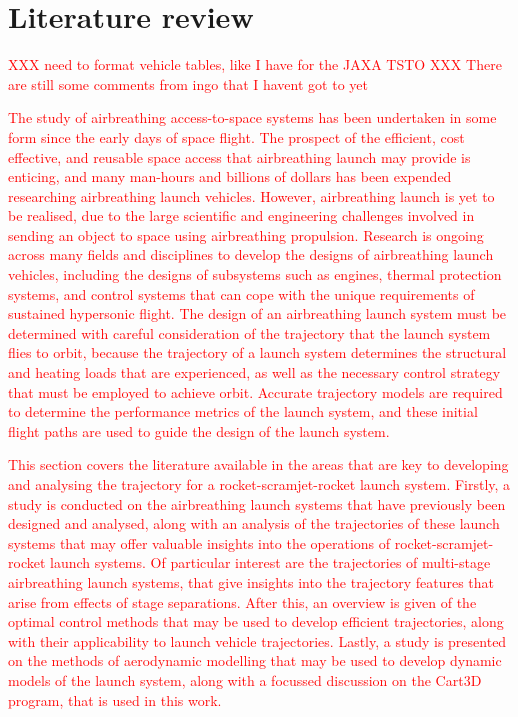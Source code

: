 
\cleardoublepage
\chapter{Literature review}\label{chapter:literature-review}
  \textcolor{red}{XXX need to format vehicle tables, like I have for the JAXA TSTO}
\textcolor{red}{XXX There are still some comments from ingo that I havent got to yet}
	
  \textcolor{red}{
  The study of airbreathing access-to-space systems has been undertaken in some form since the early days of space flight. The prospect of the efficient, cost effective, and reusable space access that airbreathing launch may provide is enticing, and many man-hours and billions of dollars has been expended researching airbreathing launch vehicles. However, airbreathing launch is yet to be realised, due to the large scientific and engineering challenges involved in sending an object to space using airbreathing propulsion. Research is ongoing across many fields and disciplines to develop the designs of airbreathing launch vehicles, including the designs of subsystems such as engines, thermal protection systems, and control systems that can cope with the unique requirements of sustained hypersonic flight. 
}
\textcolor{red}{
  The design of an airbreathing launch system must be determined with careful consideration of the trajectory that the launch system flies to orbit, because the trajectory of a launch system determines the structural and heating loads that are experienced, as well as the necessary control strategy that must be employed to achieve orbit. Accurate trajectory models are required to determine the performance metrics of the launch system, and these initial flight paths are used to guide the design of the launch system.
}



\textcolor{red}{
This section covers the literature available in the areas that are key to developing and analysing the trajectory for a rocket-scramjet-rocket launch system. 
Firstly, a study is conducted on the airbreathing launch systems that have previously been designed and analysed, along with an analysis of the trajectories of these launch systems that may offer valuable insights into the operations of rocket-scramjet-rocket launch systems. Of particular interest are the trajectories of multi-stage airbreathing launch systems, that give insights into the trajectory features that arise from effects of stage separations. 
After this, an overview is given of the optimal control methods that may be used to develop efficient trajectories, along with their applicability to launch vehicle trajectories. 
Lastly, a study is presented on the methods of aerodynamic modelling that may be used to develop dynamic models of the launch system, along with a focussed discussion on the Cart3D program, that is used in this work. 
}

